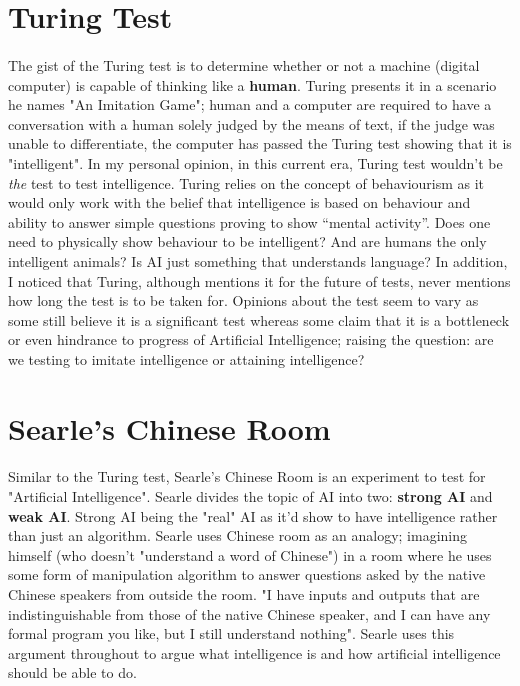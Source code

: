 \documentclass[10pt]{article}
\begin{document}
\newpage																		

\tableofcontents 

\newpage

  \section{Turing Test}
  \paragraph{} \setlength\parindent{24pt}
  The gist of the Turing test is to determine whether or not a machine (digital computer) is capable of thinking like a \textbf{human}. Turing presents it in a scenario he names "An Imitation Game"; human and a computer are required to have a conversation with a human solely judged by the means of text, if the judge was unable to differentiate, the computer has passed the Turing test showing that it is "intelligent". 
  \newline \newline
  In my personal opinion, in this current era, Turing test wouldn't be \textit{the} test to test intelligence. Turing relies on the concept of behaviourism as it would only work with the belief that intelligence is based on behaviour and ability to answer simple questions proving to show “mental activity”. Does one need to physically show behaviour to be intelligent? And are humans the only intelligent animals? Is AI just something that understands language? In addition, I noticed that Turing, although mentions it for the future of tests, never mentions how long the test is to be taken for.
  \newline \newline
  Opinions about the test seem to vary as some still believe it is a significant test whereas some claim that it is a bottleneck or even hindrance to progress of Artificial Intelligence; raising the question: are we testing to imitate intelligence or attaining intelligence?


  \section{Searle's Chinese Room}
  \paragraph{} \indent
  Similar to the Turing test, Searle's Chinese Room is an experiment to test for "Artificial Intelligence". Searle divides the topic of AI into two: \textbf{strong AI} and \textbf{weak AI}. Strong AI being the "real" AI as it'd show to have intelligence rather than just an algorithm. Searle uses Chinese room as an analogy; imagining himself (who doesn't "understand a word of Chinese") in a room where he uses some form of manipulation algorithm to answer questions asked by the native Chinese speakers from outside the room. "I have inputs and outputs that are indistinguishable from those of the native Chinese speaker, and I can have any formal program you like, but I still understand nothing". Searle uses this argument throughout to argue what intelligence is and how artificial intelligence should be able to do. 
\end{document}
